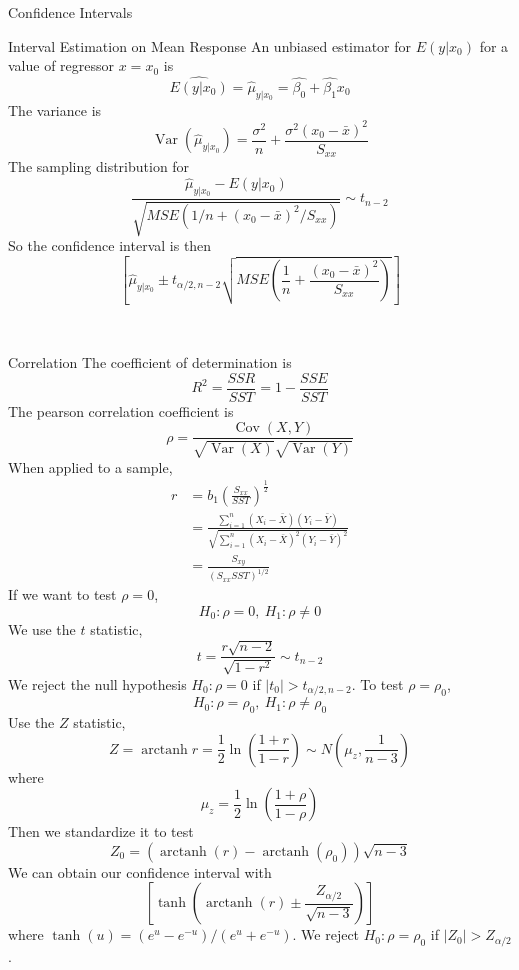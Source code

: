 \documentclass{article}
\DeclareMathOperator{\Var}{Var}
\DeclareMathOperator{\Cov}{Cov}
\DeclareMathOperator{\atanh}{arctanh}
\begin{document}
\begin{multicols*}{3}
\begin{blackbox}{Confidence Intervals}
        \begin{brownbox}{Interval Estimation on Mean Response}
            An unbiased estimator for $E(y|x_0)$ for a value of regressor $x=x_0$ is 
            \[\widehat{E(y|x_0)} = \hat{\mu}_{y|x_0} = \hat{\beta_0} + \hat{\beta_1}x_0\]
            The variance is 
            \[\Var(\hat{\mu}_{y|x_0}) = \frac{\sigma^2}{n} + \frac{\sigma^2(x_0-\bar{x})^2}{S_{xx}}\]
            The sampling distribution for 
            \[\frac{\hat{\mu}_{y|x_0} - E(y|x_0)}{\sqrt{MSE(1/n + (x_0-\bar{x})^2/S_{xx})}} \sim t_{n-2}\]
            So the confidence interval is then 
            \[\left[\hat{\mu}_{y|x_0} \pm t_{\alpha/2, n-2}\sqrt{MSE\left(\frac{1}{n} + \frac{(x_0 - \bar{x})^2}{S_{xx}}\right)} \right]\]
        \end{brownbox}\\[-2ex]
    \end{blackbox}
    \begin{blackbox}{Correlation}
        The coefficient of determination is 
        \[R^2 = \frac{SSR}{SST} = 1 - \frac{SSE}{SST}\]
        The pearson correlation coefficient is 
        \[\rho = \frac{\Cov(X,Y)}{\sqrt{\Var(X)}\sqrt{\Var(Y)}}\]
        When applied to a sample, 
        \begin{align*}
            r &= b_1\left(\frac{S_{xx}}{SST}\right)^{\frac{1}{2}}\\
              &= \frac{\sum_{i=1}^n(X_i - \bar{X})(Y_i - \bar{Y})}{\sqrt{\sum_{i=1}^n (X_i - \bar{X})^2(Y_i - \bar{Y})^2}}\\
              &= \frac{S_{xy}}{(S_{xx}SST)^{1/2}}  
        \end{align*}
        If we want to test $\rho = 0$, 
        \[H_0: \rho = 0, \ H_1: \rho \neq 0\]
        We use the $t$ statistic,
        \[t = \frac{r\sqrt{n-2}}{\sqrt{1-r^2}} \sim t_{n-2}\]
        We reject the null hypothesis $H_0: \rho = 0$ if $|t_0| > t_{\alpha/2, n-2}$. To test $\rho = \rho_0$, 
        \[H_0: \rho = \rho_0, \ H_1: \rho \neq \rho_0\]
        Use the $Z$ statistic, 
        \[Z = \atanh r = \frac{1}{2}\ln\left(\frac{1+r}{1-r}\right) \sim N\left(\mu_z, \frac{1}{n-3}\right)\]
        where 
        \[\mu_z = \frac{1}{2}\ln\left(\frac{1+\rho}{1-\rho}\right)\]
        Then we standardize it to test 
        \[Z_0 = (\atanh(r) - \atanh(\rho_0))\sqrt{n-3}\]
        We can obtain our confidence interval with 
        \[\left[\tanh\left(\atanh(r) \pm \frac{Z_{\alpha/2}}{\sqrt{n-3}}\right)\right]\]
        where $\tanh(u) = (e^u-e^{-u})/(e^u + e^{-u})$. We reject $H_0: \rho = \rho_0$ if $|Z_0| > Z_{\alpha/2}$.
    \end{blackbox}
\end{multicols*}
\end{document}
